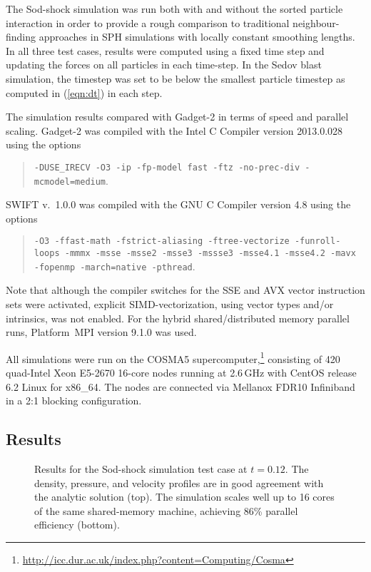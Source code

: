 \documentclass[final]{siamltex}
\newcommand{\eqn}[1]
    {(\ref{eqn:#1})}
\begin{document}
The Sod-shock simulation was run both with and without the
sorted particle interaction in order to provide a rough comparison
to traditional neighbour-finding approaches in SPH simulations with
locally constant smoothing lengths.
In all three test cases, results were
computed using a fixed time step and updating the forces on all
particles in each time-step.
In the Sedov blast simulation, the timestep was set to be below
the smallest particle timestep as computed in \eqn{dt}
in each step.

The simulation results compared with Gadget-2 \cite{ref:Springel2005}
in terms of  speed and parallel scaling.
Gadget-2 was compiled with the Intel C Compiler version 2013.0.028
using the options 
\begin{quote}{\tt -DUSE\_IRECV -O3 -ip -fp-model fast -ftz
-no-prec-div -mcmodel=medium}.\end{quote}
SWIFT v.~1.0.0 was compiled with the GNU C Compiler version 4.8
using the options
\begin{quote}{\tt -O3 -ffast-math -fstrict-aliasing
-ftree-vectorize -funroll-loops -mmmx -msse -msse2 -msse3 -mssse3
-msse4.1 -msse4.2 -mavx -fopenmp -march=native -pthread}.\end{quote}
Note that although the compiler switches for the SSE and AVX
vector instruction sets were activated, explicit
SIMD-vectorization, using vector types and/or intrinsics, was not enabled.
For the hybrid shared/distributed memory parallel runs,
Platform~MPI version 9.1.0 was used.

All simulations were run on the COSMA5 supercomputer,\footnote{\url{http://icc.dur.ac.uk/index.php?content=Computing/Cosma}}
consisting of 420 quad-Intel Xeon E5-2670
16-core nodes running at 2.6\,GHz with CentOS release 6.2 Linux
for x86\_64.
The nodes are connected
via Mellanox FDR10 Infiniband in a 2:1 blocking configuration.


\subsection{Results}

\begin{figure}
    \centerline{}%
    \caption{Results for the Sod-shock simulation test case at $t=0.12$.
        The density,
        pressure, and velocity profiles are in good agreement with the
        analytic solution (top).
        The simulation scales well up to 16 cores of the same shared-memory
        machine, achieving 86\% parallel efficiency (bottom).}
    \label{fig:SodShock}
\end{figure}
\end{document}
